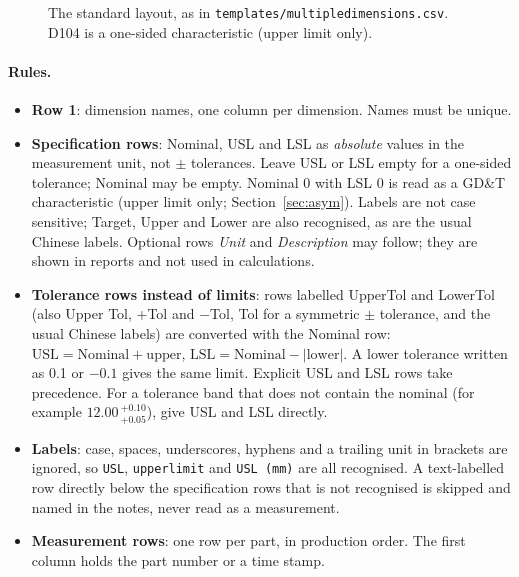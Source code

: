 \documentclass[a4paper,11pt,oneside,openany,parskip=half-,headings=standardclasses,toc=flat,numbers=noenddot]{scrbook}
\newcommand{\code}[1]{\texttt{\begingroup\def\_{\textunderscore\allowbreak}#1\endgroup}}
\newcommand{\secref}[1]{Section~\ref{#1}}
\begin{document}
\begin{figure}[!htp]
\caption{The standard layout, as in \code{templates/multiple\_dimensions.csv}. D104 is a one-sided
characteristic (upper limit only).}\label{fig:layout}
\end{figure}

\paragraph{Rules.}
\begin{itemize}
\item \textbf{Row 1}: dimension names, one column per dimension. Names must be unique.
\item \textbf{Specification rows}: Nominal, USL and LSL as \emph{absolute} values in the measurement
  unit, not $\pm$ tolerances. Leave USL or LSL empty for a one-sided tolerance; Nominal may be empty.
  Nominal 0 with LSL 0 is read as a GD\&T characteristic (upper limit only; \secref{sec:asym}).
  Labels are not case sensitive; Target, Upper and Lower are also recognised, as are the usual Chinese
  labels. Optional rows \emph{Unit} and \emph{Description} may follow; they are shown in reports and not
  used in calculations.
\item \textbf{Tolerance rows instead of limits}: rows labelled UpperTol and LowerTol (also Upper Tol,
  +Tol and $-$Tol, Tol for a symmetric $\pm$ tolerance, and the usual Chinese labels) are converted with the
  Nominal row: $\mathrm{USL} = \text{Nominal} + \text{upper}$, $\mathrm{LSL} = \text{Nominal} - |\text{lower}|$.
  A lower tolerance written as 0.1 or $-0.1$ gives the same limit. Explicit USL and LSL rows take precedence.
  For a tolerance band that does not contain the nominal (for example $12.00\,{}^{+0.10}_{+0.05}$), give
  USL and LSL directly.
\item \textbf{Labels}: case, spaces, underscores, hyphens and a trailing unit in brackets are ignored, so
  \code{USL}, \code{upper\_limit} and \code{USL (mm)} are all recognised. A text-labelled row directly below the
  specification rows that is not recognised is skipped and named in the notes, never read as a measurement.
\item \textbf{Measurement rows}: one row per part, in production order. The first column holds the
  part number or a time stamp.
\end{itemize}
\end{document}
